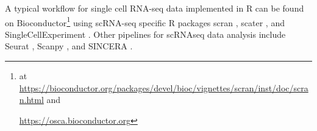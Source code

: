 
A typical workflow for single cell RNA-seq data implemented in R can be found on Bioconductor\footnote{at \url{https://bioconductor.org/packages/devel/bioc/vignettes/scran/inst/doc/scran.html} and

\url{https://osca.bioconductor.org}} using scRNA-seq specific R packages scran \cite{lun2016step, risso2016scrnaseq}, scater \cite{mccarthy2017scater}, and SingleCellExperiment 
\cite{lun2019singlecellexperiment}.
Other pipelines for scRNAseq data analysis include 
Seurat \cite{butler2018integrating},
Scanpy \cite{wolf2018scanpy}, 
and SINCERA \cite{guo2015sincera}.














